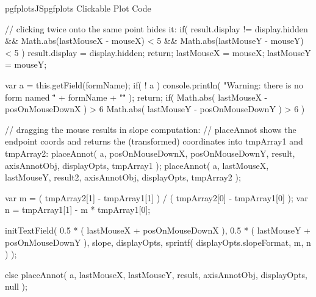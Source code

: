 {{\begin{insDLJS}[processAnnotatedPlot]{pgfplotsJS}{pgfplots Clickable Plot Code}
{	// clicking twice onto the same point hides it:
	if( result.display != display.hidden && 
		Math.abs(lastMouseX - mouseX) < 5 &&
		Math.abs(lastMouseY - mouseY) < 5 ) 
	{
		result.display = display.hidden;
		return;
	}
	lastMouseX = mouseX;
	lastMouseY = mouseY;

	var a = this.getField(formName);
	if( ! a ) {
		console.println( "Warning: there is no form named \"" + formName + "\"" );
		return;
	}
	if( Math.abs( lastMouseX - posOnMouseDownX ) > 6 \pgfplotsVERTBAR\pgfplotsVERTBAR
		Math.abs( lastMouseY - posOnMouseDownY ) > 6 )
	{
		// dragging the mouse results in slope computation:
		// placeAnnot shows the endpoint coords and returns the (transformed) coordinates into tmpArray1 and tmpArray2:
		placeAnnot( a, posOnMouseDownX, posOnMouseDownY, result, axisAnnotObj, displayOpts, tmpArray1 );
		placeAnnot( a, lastMouseX, lastMouseY, result2, axisAnnotObj, displayOpts, tmpArray2 );

		var m =  ( tmpArray2[1] - tmpArray1[1] ) / ( tmpArray2[0] - tmpArray1[0] );
		var n =  tmpArray1[1] - m * tmpArray1[0];

		initTextField( 
			0.5 * ( lastMouseX + posOnMouseDownX ),
			0.5 * ( lastMouseY + posOnMouseDownY ),
			slope,
			displayOpts,
			sprintf( displayOpts.slopeFormat, m, n ) );


	} else {
		placeAnnot( a, lastMouseX, lastMouseY, result, axisAnnotObj, displayOpts, null );
	}
}
\end{insDLJS}


\newif\ifpgfplots@clickable
\newif\ifpgfplots@annot@printable

}}
